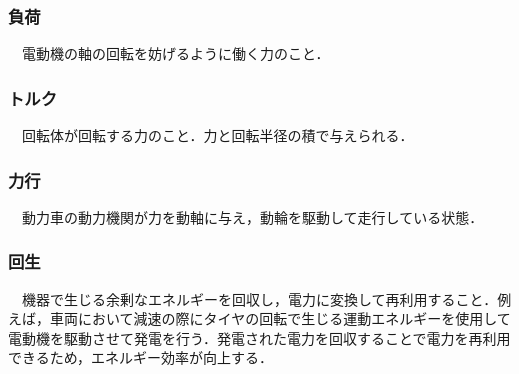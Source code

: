 \subsubsection{負荷}
　電動機の軸の回転を妨げるように働く力のこと．

\subsubsection{トルク}
　回転体が回転する力のこと．力と回転半径の積で与えられる．

\subsubsection{力行}
　動力車の動力機関が力を動軸に与え，動輪を駆動して走行している状態．

\subsubsection{回生}
　機器で生じる余剰なエネルギーを回収し，電力に変換して再利用すること．例えば，車両において減速の際にタイヤの回転で生じる運動エネルギーを使用して電動機を駆動させて発電を行う．発電された電力を回収することで電力を再利用できるため，エネルギー効率が向上する．










